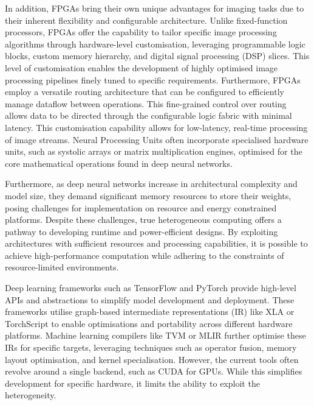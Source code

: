 \documentclass[]{spie}  %
\begin{document}
In addition, FPGAs bring their own unique advantages for imaging tasks due to their inherent flexibility and configurable architecture. Unlike fixed-function processors, FPGAs offer the capability to tailor specific image processing algorithms through hardware-level customisation, leveraging programmable logic blocks, custom memory hierarchy, and digital signal processing (DSP) slices. This level of customisation enables the development of highly optimised image processing pipelines finely tuned to specific requirements. Furthermore, FPGAs employ a versatile routing architecture that can be configured to efficiently manage dataflow between operations. This fine-grained control over routing allows data to be directed through the configurable logic fabric with minimal latency. This customisation capability allows for low-latency, real-time processing of image streams. Neural Processing Units often incorporate specialised hardware units, such as systolic arrays or matrix multiplication engines, optimised for the core mathematical operations found in deep neural networks.

Furthermore, as deep neural networks increase in architectural complexity and model size, they demand significant memory resources to store their weights, posing challenges for implementation on resource and energy constrained platforms. Despite these challenges, true heterogeneous computing offers a pathway to developing runtime and power-efficient designs. By exploiting architectures with sufficient resources and processing capabilities, it is possible to achieve high-performance computation while adhering to the constraints of resource-limited environments.

Deep learning frameworks such as TensorFlow\cite{tensorflow2015} and PyTorch\cite{Pytorch} provide high-level APIs and abstractions to simplify model development and deployment. These frameworks utilise graph-based intermediate representations (IR) like XLA or TorchScript to enable optimisations and portability across different hardware platforms. Machine learning compilers like TVM\cite{chen2018} or MLIR\cite{mlir} further optimise these IRs for specific targets, leveraging techniques such as operator fusion, memory layout optimisation, and kernel specialisation. However, the current tools often revolve around a single backend, such as CUDA for GPUs. While this simplifies development for specific hardware, it limits the ability to exploit the heterogeneity.
\end{document}
